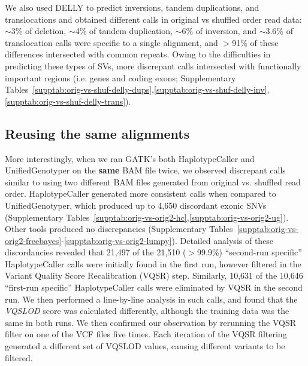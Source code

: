 \documentclass[10pt,a4paper]{article}
\begin{document}
We also used DELLY to predict inversions, tandem duplications, and translocations and obtained different calls in original vs shuffled order read data: $\sim$3\% of deletion, $\sim$4\% of tandem duplication, $\sim$6\% of inversion, and $\sim$3.6\% of translocation calls were specific to a single alignment, and $>$91\% of these differences intersected with common repeats. Owing to the difficulties in predicting
these types of SVs, more discrepant calls intersected with functionally important regions (i.e. genes and coding exons; Supplementary Tables~\ref{supptab:orig-vs-shuf-delly-dups},\ref{supptab:orig-vs-shuf-delly-inv},\ref{supptab:orig-vs-shuf-delly-trans}).

\subsection*{Reusing the same alignments}
More interestingly, when we ran GATK's both HaplotypeCaller and UnifiedGenotyper on the {\bf same} BAM file twice, we observed discrepant calls similar to using two different BAM files generated from original vs. shuffled read order. HaplotypeCaller generated more consistent calls when compared to UnifiedGenotyper, which produced up to 4,650 discordant exonic SNVs (Supplementary Tables~\ref{supptab:orig-vs-orig2-hc},\ref{supptab:orig-vs-orig2-ug}). Other tools produced no discrepancies (Supplementary Tables~\ref{supptab:orig-vs-orig2-freebayes}-\ref{supptab:orig-vs-orig2-lumpy}).
Detailed analysis of these discordancies revealed that  21,497 of the 21,510 ($>$99.9\%) ``second-run specific'' HaplotypeCaller calls were initially found in the first run, however filtered in the Variant Quality Score Recalibration (VQSR) step. Similarly, 10,631 of the 10,646 ``first-run specific'' HaplotypeCaller calls were eliminated by VQSR in the second run. We then performed a line-by-line analysis in such calls, and found that the {\it VQSLOD} score was calculated differently, although the training data was the same in both runs. We then confirmed our observation by rerunning the VQSR filter on 
one of the VCF files five times. Each iteration of the VQSR filtering generated a different set of VQSLOD values, causing different variants to be filtered.
\end{document}

